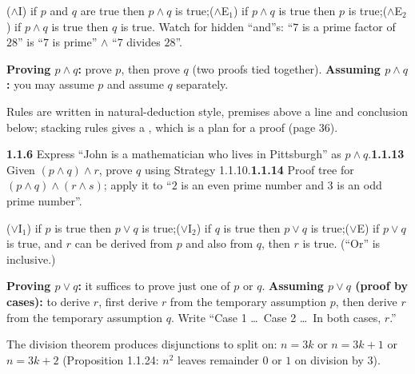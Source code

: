 \begin{key}
($\wedge$I) if $p$ and $q$ are true then $p\wedge q$ is true;\quad ($\wedge$E$_1$) if $p\wedge q$ is true then $p$ is true;\quad ($\wedge$E$_2$) if $p\wedge q$ is true then $q$ is true. Watch for hidden ``and''s: ``$7$ is a prime factor of $28$'' is ``$7$ is prime'' $\wedge$ ``$7$ divides $28$''.
\end{key}
\begin{strategy}
\textbf{Proving $p\wedge q$:} prove $p$, then prove $q$ (two proofs tied together). \textbf{Assuming $p\wedge q$:} you may assume $p$ and assume $q$ separately.
\end{strategy}
Rules are written in natural-deduction style, premises above a line and conclusion below; stacking rules gives a , which is a plan for a proof (page 36).

\begin{trybox}[{1.1.6, 1.1.13, 1.1.14 \fO}]
\textbf{1.1.6} Express ``John is a mathematician who lives in Pittsburgh'' as $p\wedge q$.\quad \textbf{1.1.13} Given $(p\wedge q)\wedge r$, prove $q$ using Strategy 1.1.10.\quad \textbf{1.1.14} Proof tree for $(p\wedge q)\wedge(r\wedge s)$; apply it to ``$2$ is an even prime number and $3$ is an odd prime number''.
\end{trybox}

\begin{key}
($\vee$I$_1$) if $p$ is true then $p\vee q$ is true;\quad ($\vee$I$_2$) if $q$ is true then $p\vee q$ is true;\quad ($\vee$E) if $p\vee q$ is true, and $r$ can be derived from $p$ and also from $q$, then $r$ is true. (``Or'' is inclusive.)
\end{key}
\begin{strategy}
\textbf{Proving $p\vee q$:} it suffices to prove just one of $p$ or $q$. \textbf{Assuming $p\vee q$ (proof by cases):} to derive $r$, first derive $r$ from the temporary assumption $p$, then derive $r$ from the temporary assumption $q$. Write ``Case 1 \dots\ Case 2 \dots\ In both cases, $r$.''
\end{strategy}
The division theorem produces disjunctions to split on: $n=3k$ or $n=3k+1$ or $n=3k+2$ (Proposition 1.1.24: $n^2$ leaves remainder $0$ or $1$ on division by $3$).

